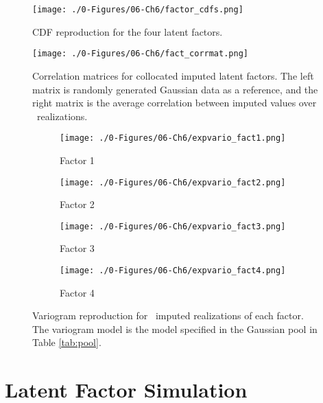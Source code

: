 \begin{figure}[htb!]
    \centering
    \texttt{[image: ./0-Figures/06-Ch6/factor\_cdfs.png]}
    \caption{\Gls{CDF} reproduction for the four latent factors. }
    \label{fig:factor_cdfs}
\end{figure}

\begin{figure}[htb!]
    \centering
    \texttt{[image: ./0-Figures/06-Ch6/fact\_corrmat.png]}
    \caption{Correlation matrices for collocated imputed latent factors. The left matrix is randomly generated Gaussian data as a reference, and the right matrix is the average correlation between imputed values over \csnreals \ realizations.}
    \label{fig:fact_corrmat}
\end{figure}

\begin{figure}
    \begin{subfigure}{1.0\textwidth}
        \centering
        \texttt{[image: ./0-Figures/06-Ch6/expvario\_fact1.png]}
        \caption{Factor 1}
    \end{subfigure}
    \begin{subfigure}{1.0\textwidth}
        \centering
        \texttt{[image: ./0-Figures/06-Ch6/expvario\_fact2.png]}
        \caption{Factor 2}
    \end{subfigure}
    \begin{subfigure}{1.0\textwidth}
        \centering
        \texttt{[image: ./0-Figures/06-Ch6/expvario\_fact3.png]}
        \caption{Factor 3}
    \end{subfigure}
    \begin{subfigure}{1.0\textwidth}
        \centering
        \texttt{[image: ./0-Figures/06-Ch6/expvario\_fact4.png]}
        \caption{Factor 4}
    \end{subfigure}
    \caption{Variogram reproduction for \csnreals \ imputed realizations of each factor. The variogram model is the model specified in the Gaussian pool in Table \ref{tab:pool}.}
    \label{fig:nmrimp_repro_gvario}
\end{figure}


\FloatBarrier
\section{Latent Factor Simulation}
\label{sec:fact_sim}

